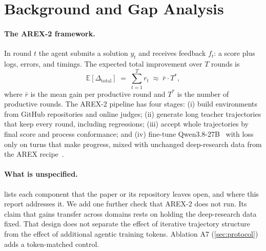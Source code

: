 \documentclass[11pt]{article}
\begin{document}
\section{Background and Gap Analysis}
\label{sec:background}

\paragraph{The AREX-2 framework.}
In round $t$ the agent submits a solution $y_t$ and receives feedback $f_t$: a score plus logs, errors, and timings. The expected total improvement over $T$ rounds is
\begin{equation}
  \mathbb{E}[\Delta_{\text{total}}] \;=\; \sum_{t=1}^{T} r_t \;\approx\; \bar{r}\cdot T^{*},
  \label{eq:decomp}
\end{equation}
where $\bar{r}$ is the mean gain per productive round and $T^{*}$ is the number of productive rounds. The AREX-2 pipeline has four stages: (i) build environments from GitHub repositories and online judges; (ii) generate long teacher trajectories that keep every round, including regressions; (iii) accept whole trajectories by final score and process conformance; and (iv) fine-tune Qwen3.8-27B~\citep{qwen2026qwen38} with loss only on turns that make progress, mixed with unchanged deep-research data from the AREX recipe~\citep{lu2026arex}.

\paragraph{What is unspecified.}
 lists each component that the paper or its repository leaves open, and where this report addresses it. We add one further check that AREX-2 does not run. Its claim that gains transfer across domains rests on holding the deep-research data fixed. That design does not separate the effect of iterative trajectory structure from the effect of additional agentic training tokens. Ablation A7 (\cref{sec:protocol}) adds a token-matched control.
\end{document}
